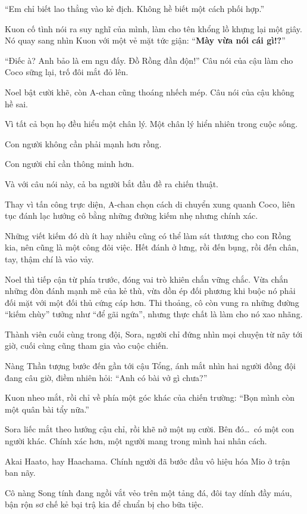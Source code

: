 \documentclass[../main.tex]{subfiles}
\begin{document}
``Em chỉ biết lao thẳng vào kẻ địch. Không hề biết một cách phối hợp.''

Kuon cố tình nói ra suy nghĩ của mình, làm cho tên khổng lồ khựng lại một giây. Nó quay sang nhìn Kuon với một vẻ mặt tức giận: ``\textbf{Mày vừa nói cái gì!?}''

``Điếc à? Anh bảo là em ngu đấy. Đồ Rồng đần độn!'' Câu nói của cậu làm cho Coco sững lại, trố đôi mắt đỏ lên.

Noel bật cười khẽ, còn A-chan cũng thoáng nhếch mép. Câu nói của cậu không hề sai.

Vì tất cả bọn họ đều hiểu một chân lý. Một chân lý hiển nhiên trong cuộc sống.

Con người không cần phải mạnh hơn rồng.

Con người chỉ cần thông minh hơn.

Và với câu nói này, cả ba người bắt đầu đề ra chiến thuật.

Thay vì tấn công trực diện, A-chan chọn cách di chuyển xung quanh Coco, liên tục đánh lạc hướng cô bằng những đường kiếm nhẹ nhưng chính xác.

Những viết kiếm đó dù ít hay nhiều cũng có thể làm sát thương cho con Rồng kia, nên cũng là một công đôi việc. Hết đánh ở lưng, rồi đến bụng, rồi đến chân, tay, thậm chí là vảo vảy.

Noel thì tiếp cận từ phía trước, đóng vai trò khiên chắn vững chắc. Vừa chắn những đòn đánh mạnh mẽ của kẻ thù, vừa dồn ép đối phương khi buộc nó phải đối mặt với một đối thủ cứng cáp hơn. Thi thoảng, cô còn vung ra những đường ``kiếm chùy'' tưởng như ``để gãi ngứa'', nhưng thực chất là làm cho nó xao nhãng.

Thành viên cuối cùng trong đội, Sora, người chỉ đứng nhìn mọi chuyện từ nãy tới giờ, cuối cùng cũng tham gia vào cuộc chiến.

Nàng Thần tượng bước đến gần tới cậu Tổng, ánh mắt nhìn hai người đồng đội đang câu giờ, điềm nhiên hỏi: ``Anh có bài vở gì chưa?''

Kuon nheo mắt, rồi chỉ về phía một góc khác của chiến trường: ``Bọn mình còn một quân bài tẩy nữa.''

Sora liếc mắt theo hướng cậu chỉ, rồi khẽ nở một nụ cười. Bên đó\dots\ có một con người khác. Chính xác hơn, một người mang trong mình hai nhân cách.

Akai Haato, hay Haachama. Chính người đã bước đầu vô hiệu hóa Mio ở trận ban nãy.

Cô nàng Song tính đang ngồi vắt vẻo trên một tảng đá, đôi tay dính đầy máu, bận rộn sơ chế kẻ bại trậ kia để chuẩn bị cho bữa tiệc.
\end{document}
